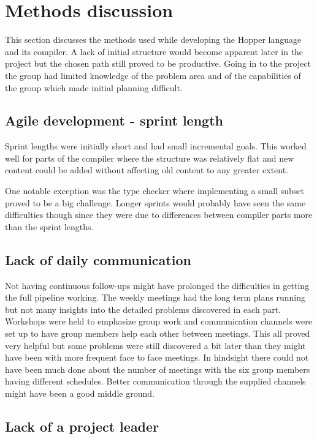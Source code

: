 \section{Methods discussion}

This section discusses the methods used while developing the Hopper language and its compiler. A lack of initial structure would become apparent later in the project but the chosen path still proved to be productive. Going in to the project the group had limited knowledge of the problem area and of the capabilities of the group which made initial planning difficult.

\subsection{Agile development - sprint length}

Sprint lengths were initially short and had small incremental goals. This worked well for parts of the compiler where the structure was relatively flat and new content could be added without affecting old content to any greater extent. 

One notable exception was the type checker where implementing a small subset proved to be a big challenge. Longer sprints would probably have seen the same difficulties though since they were due to differences between compiler parts more than the sprint lengths.

\subsection{Lack of daily communication}

Not having continuous follow-ups might have prolonged the difficulties in getting the full pipeline working. The weekly meetings had the long term plans running but not many insights into the detailed problems discovered in each part. Workshops were held to emphasize group work and communication channels were set up to have group members help each other between meetings. This all proved very helpful but some problems were still discovered a bit later than they might have been with more frequent face to face meetings. In hindsight there could not have been much done about the number of meetings with the six group members having different schedules. Better communication through the supplied channels might have been a good middle ground.

\subsection{Lack of a project leader}

